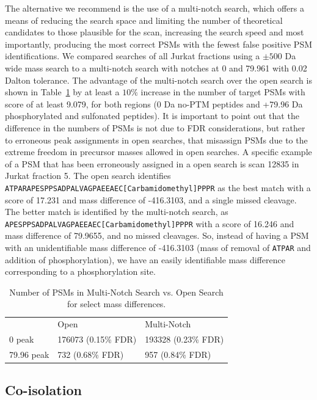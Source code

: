 \documentclass[journal=jprobs,manuscript=article]{achemso}
\begin{document}
The alternative we recommend is the use of a multi-notch search, which offers a means of reducing the search space and limiting the number of theoretical candidates to those plausible for the scan, increasing the search speed and most importantly, producing the most correct PSMs with the fewest false positive PSM identifications.
We compared searches of all Jurkat fractions using a $\pm 500$ Da wide mass search to a multi-notch search with notches at 0 and 79.961 with 0.02 Dalton tolerance.
The advantage of the multi-notch search over the open search is shown in Table~\ref{tbl:multiVsWide} by at least a $10\%$ increase in the number of target PSMs with score of at least 9.079, for both regions (0 Da no-PTM peptides and +79.96 Da phosphorylated and sulfonated peptides).
It is important to point out that the difference in the numbers of PSMs is not due to FDR considerations, but rather to erroneous peak assignments in open searches, that misassign PSMs due to the extreme freedom in precursor masses allowed in open searches.
A specific example of a PSM that has been erroneously assigned in a open search is scan 12835 in Jurkat fraction 5.
The open search identifies \texttt{ATPARAPESPPSADPALVAGPAEEAEC[Carbamidomethyl]PPPR} as the best match with a score of 17.231 and mass difference of -416.3103, and a single missed cleavage.
The better match is identified by the multi-notch search, as \texttt{APESPPSADPALVAGPAEEAEC[Carbamidomethyl]PPPR} with a score of 16.246 and mass difference of 79.9655, and no missed cleavages.
So, instead of having a PSM with an unidentifiable mass difference of -416.3103 (mass of removal of \texttt{ATPAR} and addition of phosphorylation), we have an easily identifiable mass difference corresponding to a phosphorylation site.

\begin{table}[]
\centering
\caption{Number of PSMs in Multi-Notch Search vs. Open Search for select mass differences.}
\label{tbl:multiVsWide}
\begin{tabular}{lll}
               & Open                     & Multi-Notch         \\
0 peak         & 176073  (0.15\% FDR)     & 193328 (0.23\% FDR) \\
79.96 peak     & 732   (0.68\% FDR)       & 957  (0.84\% FDR)   \\
\end{tabular}
\end{table}

\subsection{Co-isolation}
\end{document}

